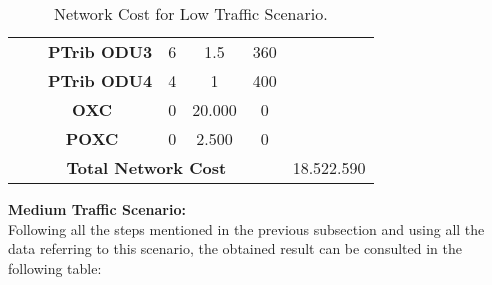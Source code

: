 \begin{table}[H]
\begin{tabular}{|c|c|c|c|c|c|c|}
                                    &                               & \textbf{PTrib ODU3} & 6                 & 1.5                 & 360           &                             \\ \cline{3-6}
                                    &                               & \textbf{PTrib ODU4} & 4                 & 1                   & 400           &                             \\ \cline{2-6}
                                    & \multicolumn{2}{c|}{\textbf{OXC}}                   & 0                 & 20.000              & 0             &                             \\ \cline{2-6}
                                    & \multicolumn{2}{c|}{\textbf{POXC}}                  & 0                 & 2.500               & 0             &                             \\ \hline
\multicolumn{6}{|c|}{\textbf{Total Network Cost}}                                                                                                   & 18.522.590                  \\ \hline
\end{tabular}
\caption{Network Cost for Low Traffic Scenario.}
\end{table}

\textbf{Medium Traffic Scenario:}\\

Following all the steps mentioned in the previous subsection and using all the data referring to this scenario, the obtained result can be consulted in the following table:

